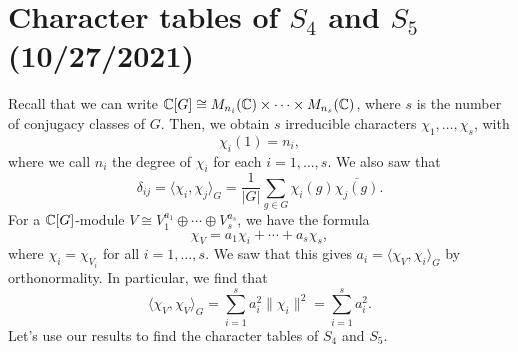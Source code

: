 \section{Character tables of $S_4$ and $S_5$ (10/27/2021)}
Recall that we can write $\mathbb{C}[G] \cong M_{n_i}(\mathbb{C}) \times \cdots \times M_{n_s}(\mathbb{C})$, 
where $s$ is the number of conjugacy classes of $G$. Then, we obtain $s$ 
irreducible characters $\chi_1, \dots, \chi_s$, with 
\[ \chi_i(1) = n_i, \] 
where we call $n_i$ the degree of $\chi_i$ for each $i = 1, \dots, s$. We also saw 
that 
\[ \delta_{ij} = \langle \chi_i, \chi_j \rangle_G = \frac1{|G|} \sum_{g\in G} 
\chi_i(g) \overline{\chi_j(g)}. \] 
For a $\mathbb{C}[G]$-module $V \cong V_1^{a_1} \oplus \cdots \oplus V_s^{a_s}$, we have 
the formula 
\[ \chi_V = a_1 \chi_i + \cdots + a_s \chi_s, \] 
where $\chi_i = \chi_{V_i}$ for all $i = 1, \dots, s$. We saw that this gives 
$a_i = \langle \chi_V, \chi_i \rangle_G$ by orthonormality. In particular, we 
find that 
\[ \langle \chi_V, \chi_V \rangle_G = \sum_{i=1}^s a_i^2 \|\chi_i\|^2 = 
\sum_{i=1}^s a_i^2. \] 
Let's use our results to find the character tables of $S_4$ and $S_5$. 

